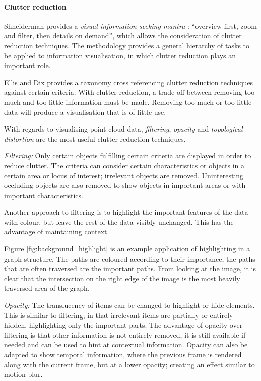 \paragraph{Clutter reduction}
\label{sub:background_clutter}

Shneiderman provides a \emph{visual information-seeking mantra}
\citep{shneiderman96}: ``overview first, zoom and filter, then details on
demand'', which allows the consideration of clutter reduction techniques. The
methodology provides a general hierarchy of tasks to be applied to information
visualisation, in which clutter reduction plays an important role.

Ellis and Dix \citep{ellis07} provides a taxonomy cross referencing clutter
reduction techniques against certain criteria. With clutter reduction, a
trade-off between removing too much and too little information must be made.
Removing too much or too little data will produce a visualisation that is of
little use.

With regards to visualising point cloud data, \emph{filtering}, \emph{opacity}
and \emph{topological distortion} are the most useful clutter reduction
techniques.

\emph{Filtering:} Only certain objects fulfilling certain criteria are
displayed in order to reduce clutter. The criteria can consider certain
characteristics or objects in a certain area or locus of interest; irrelevant
objects are removed. Uninteresting occluding objects are also removed to show
objects in important areas or with important characteristics.

Another approach to filtering is to highlight the important features of the
data with colour, but leave the rest of the data visibly unchanged. This has
the advantage of maintaining context.

Figure \ref{fig:background_highlight} is an example application of highlighting
in a graph structure. The paths are coloured according to their importance, the
paths that are often traversed are the important paths. From looking at the
image, it is clear that the intersection on the right edge of the image is the
most heavily traversed area of the graph.

\emph{Opacity:} The translucency of items can be changed to highlight or hide
elements. This is similar to filtering, in that irrelevant items are partially
or entirely hidden, highlighting only the important parts. The advantage of
opacity over filtering is that other information is not entirely removed, it is
still available if needed and can be used to hint at contextual information.
Opacity can also be adapted to show temporal information, where the previous
frame is rendered along with the current frame, but at a lower opacity;
creating an effect similar to motion blur.

